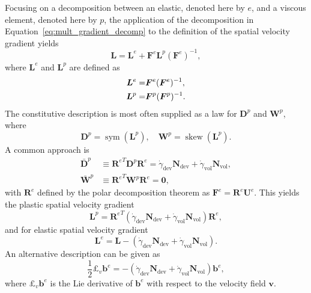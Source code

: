 Focusing on a decomposition between an elastic, denoted here by $e$, and a viscous element, denoted here by $p$, the application of the decomposition in Equation~\eqref{eq:mult_gradient_decomp} to the definition of the spatial velocity gradient yields
\begin{equation}
	\bm L = \bm L^e + \bm F^e \bm L^p (\bm F^e)^{-1},
\end{equation}
where $\bm L^e$ and $\bm L^p$ are defined as
\begin{align}
	\bm L^e =&  \do{\bm F}^e(\bm F^e)^{-1},\\
	\bm L^p =&  \do{\bm F}^p(\bm F^p)^{-1}.
\end{align}
The constitutive description is most often supplied as a law for $\bm D^p$ and $\bm W^p$, where
\begin{equation}
	\bm D^p = \operatorname{sym}(\bm L^p),\quad \bm W^p = \operatorname{skew}(\bm L^p).
\end{equation}
A common approach is \citep{desouzanetoComputationalMethodsPlasticity2008}
\begin{align}
  \label{eq:rate_plasticity_de_souza}
	\bar{\bm D}^p &\equiv  {\bm R^e}^T \bm D^p \bm R^e  = \dot\gamma_\text{dev} \bm N_\text{dev} + \dot\gamma_\text{vol} \bm N_\text{vol},\\
	\bar{\bm W}^p &\equiv {\bm R^e}^T \bm W^p \bm R^e = \bm 0,
\end{align}
with $\bm R^e$ defined by the polar decomposition theorem as $\bm F^e = \bm R^e\bm U^e$.
This yields the plastic spatial velocity gradient
\begin{equation}
	\bm L^p = {\bm R^e}^T(\dot\gamma_\text{dev} \bm N_\text{dev} + \dot\gamma_\text{vol} \bm N_\text{vol})\bm R^e,
\end{equation}
and for elastic spatial velocity gradient
\begin{equation}
	\bm L^e = \bm L - (\dot\gamma_\text{dev} \bm N_\text{dev} + \dot\gamma_\text{vol} \bm N_\text{vol}).
\end{equation}
An alternative description can be given as
\begin{equation}
  \label{eq:flow_rule_lie_derivative}
	\frac{1}{2}£_v \bm b^e = -(\dot\gamma_\text{dev} \bm N_\text{dev} + \dot\gamma_\text{vol} \bm N_\text{vol})\bm b^e,
\end{equation}
where $£_v \bm b^e$ is the Lie derivative of $\bm b^e$ with respect to the velocity field $\bm v$.

